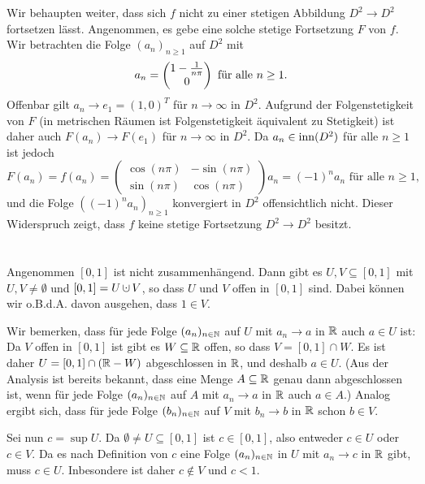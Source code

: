 \documentclass[a4paper,10pt]{article}
\begin{document}
Wir behaupten weiter, dass sich $f$ nicht zu einer stetigen Abbildung $D^2 \to D^2$ fortsetzen lässt. Angenommen, es gebe eine solche stetige Fortsetzung $F$ von $f$. Wir betrachten die Folge $(a_n)_{n \geq 1}$ auf $D^2$ mit
\[
 a_n = \begin{pmatrix} 1-\frac{1}{n\pi} \\ 0\end{pmatrix} \text{ für alle } n \geq 1.
\]
Offenbar gilt $a_n \to e_1 = (1,0)^T$ für $n \to \infty$ in $D^2$. Aufgrund der Folgenstetigkeit von $F$ (in metrischen Räumen ist Folgenstetigkeit äquivalent zu Stetigkeit) ist daher auch $F(a_n) \to F(e_1)$ für $n \to \infty$ in $D^2$. Da $a_n \in \operatorname{inn}(D^2)$ für alle $n \geq 1$ ist jedoch
\[
 F(a_n) =
 f(a_n) =
 \begin{pmatrix}
  \cos\left(n\pi\right) & -\sin\left(n\pi\right) \\
  \sin\left(n\pi\right) &  \cos\left(n\pi\right)
 \end{pmatrix}
 a_n
 = (-1)^n a_n \text{ für alle } n \geq 1,
\]
und die Folge $((-1)^n a_n)_{n \geq 1}$ konvergiert in $D^2$ offensichtlich nicht. Dieser Widerspruch zeigt, dass $f$ keine stetige Fortsetzung $D^2 \to D^2$ besitzt.





\section{}


\subsection{}
Angenommen $[0,1]$ ist nicht zusammenhängend. Dann gibt es $U, V \subseteq [0,1]$ mit $U, V \neq \emptyset$ und $[0,1] = U \dotcup V$, so dass $U$ und $V$ offen in $[0,1]$ sind. Dabei können wir o.B.d.A. davon ausgehen, dass $1 \in V$.

Wir bemerken, dass für jede Folge $(a_n)_{n \in \mathbb{N}}$ auf $U$ mit $a_n \to a$ in $\mathbb{R}$ auch $a \in U$ ist: Da $V$ offen in $[0,1]$ ist gibt es $W \subseteq \mathbb{R}$ offen, so dass $V = [0,1] \cap W$. Es ist daher $U = [0,1] \cap (\mathbb{R}-W)$ abgeschlossen in $\mathbb{R}$, und deshalb $a \in U$. (Aus der Analysis ist bereits bekannt, dass eine Menge $A \subseteq \mathbb{R}$ genau dann abgeschlossen ist, wenn für jede Folge $(a_n)_{n \in \mathbb{N}}$ auf $A$ mit $a_n \to a$ in $\mathbb{R}$ auch $a \in A$.) Analog ergibt sich, dass für jede Folge $(b_n)_{n \in \mathbb{N}}$ auf $V$ mit $b_n \to b$ in $\mathbb{R}$ schon $b \in V$.

Sei nun $c = \sup U$. Da $\emptyset \neq U \subseteq [0,1]$ ist $c \in [0,1]$, also entweder $c \in U$ oder $c \in V$. Da es nach Definition von $c$ eine Folge $(a_n)_{n \in \mathbb{N}}$ in $U$ mit $a_n \to c$ in $\mathbb{R}$ gibt, muss $c \in U$. Inbesondere ist daher $c \not\in V$ und $c < 1$.
\end{document}
